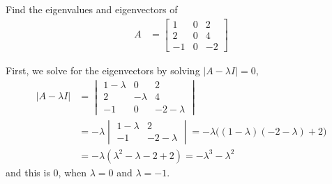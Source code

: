 \begin{example}
Find the eigenvalues and eigenvectors of 
%
\begin{align*}
A & = \begin{bmatrix}
1 & 0 & 2 \\
2 & 0 & 4 \\
-1 & 0 & -2 
\end{bmatrix}
\end{align*}

\solution

First, we solve for the eigenvectors by solving $|A-\lambda I|=0$, 
%
\begin{align*}
|A-\lambda I| & = \begin{vmatrix}
1-\lambda & 0 & 2 \\
2 & -\lambda & 4 \\
-1 & 0 & -2- \lambda 
\end{vmatrix} \\
& = -\lambda \begin{vmatrix}
1-\lambda & 2 \\
-1 & -2-\lambda 
\end{vmatrix} = -\lambda \bigl( (1-\lambda)(-2-\lambda)+2 \bigr) \\
& = -\lambda (\lambda^2 - \lambda -2 + 2)  = -\lambda^3 - \lambda^2 
\end{align*}
and this is 0, when $\lambda=0$ and $\lambda = -1$.  


\end{example}
